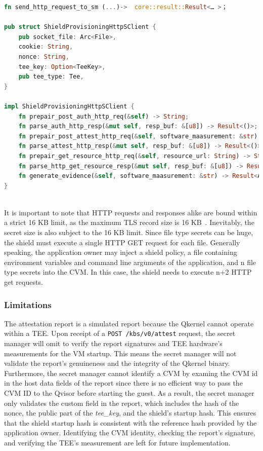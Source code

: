 \begin{lstlisting}[language=rust, caption= Functions for building the HTTP requests defined in the KBS attestation protocol, label={lst:http_connection}]
fn send_http_request_to_sm (...)->  core::result::Result<… >；

pub struct ShieldProvisioningHttpSClient {
    pub socket_file: Arc<File>,
    cookie: String,
    nonce: String,
    tee_key: Option<TeeKey>,
    pub tee_type: Tee,
}

impl ShieldProvisioningHttpSClient {
    fn prepair_post_auth_http_req(&self) -> String;
    fn parse_auth_http_resp(&mut self, resp_buf: &[u8]) -> Result<()>;
    fn prepair_post_attest_http_req(&self, software_maasurement: &str) -> Result<String>;
    fn parse_attest_http_resp(&mut self, resp_buf: &[u8]) -> Result<()>;
    fn prepair_get_resource_http_req(&self, resource_url: String) -> String;
    fn parse_http_get_resource_resp(&mut self, resp_buf: &[u8]) -> Result<Vec<u8>>;
    fn generate_evidence(&self, software_maasurement: &str) -> Result<Attestation>;
}
    
\end{lstlisting}

It is important to note that HTTP requests and responses alike are bound within a strict 16 KB limit, as the maximum TLS record size is 16 KB~\cite*{tls_record_size}. Inevitably, the secret size is also subject to the 16 KB limit. Since file type secrets can be huge, the 
shield must execute a single HTTP GET request for each file. Generally speaking, the application owner may inject a shield policy, a file containing environment variables and command line arguments of the application, and n file type secrets into the \acrshort{CVM}. 
In this case, the shield needs to execute n+2 HTTP get requests.

\subsubsection{Limitations}
\label{subsec:Limitations}

The attestation report is a simulated report because the Qkernel cannot operate within a \acrshort{TEE}. Upon receipt of a \texttt{POST /kbs/v0/attest} request, the secret manager will omit to verify the report signatures and \acrshort{TEE} hardware's measurements for the VM startup. 
This means the secret manager will not validate the report's genuineness and the integrity of the Qkernel binary. Furthermore, the secret manager cannot identify a \acrshort{CVM} by examing the \acrshort{CVM} id in the host data fields of the report since there is no efficient way to pass the \acrshort{CVM}
ID to the Qvisor before starting the guest. As a result, the secret manager only validates the custom field in the report, which includes the hash of the nonce, the public part of the \emph{tee\_key}, and the shield's startup hash. This ensures that the shield startup hash is consistent with the 
reference hash provided by the application owner. Identifying the \acrshort{CVM} identity, checking the report's signature, and verifying the \acrshort{TEE}'s measurement are left for future implementation.


